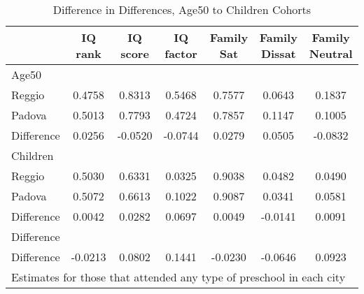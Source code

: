 \begin{table}[htbp]\centering
\caption{Difference in Differences, Age50 to Children Cohorts}
\begin{tabular}{l*{6}{c}}
\hline\hline
            &     IQ rank&    IQ score&   IQ factor&  Family Sat&Family Dissat&Family Neutral\\
\hline
Age50       &            &            &            &            &            &            \\
Reggio      &      0.4758&      0.8313&      0.5468&      0.7577&      0.0643&      0.1837\\
Padova      &      0.5013&      0.7793&      0.4724&      0.7857&      0.1147&      0.1005\\
Difference  &      0.0256&     -0.0520&     -0.0744&      0.0279&      0.0505&     -0.0832\\
\hline
Children    &            &            &            &            &            &            \\
Reggio      &      0.5030&      0.6331&      0.0325&      0.9038&      0.0482&      0.0490\\
Padova      &      0.5072&      0.6613&      0.1022&      0.9087&      0.0341&      0.0581\\
Difference  &      0.0042&      0.0282&      0.0697&      0.0049&     -0.0141&      0.0091\\
\hline
Difference  &            &            &            &            &            &            \\
Difference  &     -0.0213&      0.0802&      0.1441&     -0.0230&     -0.0646&      0.0923\\
\hline\hline
\multicolumn{7}{l}{\footnotesize Estimates for those that attended any type of preschool in each city}\\
\end{tabular}
\end{table}
